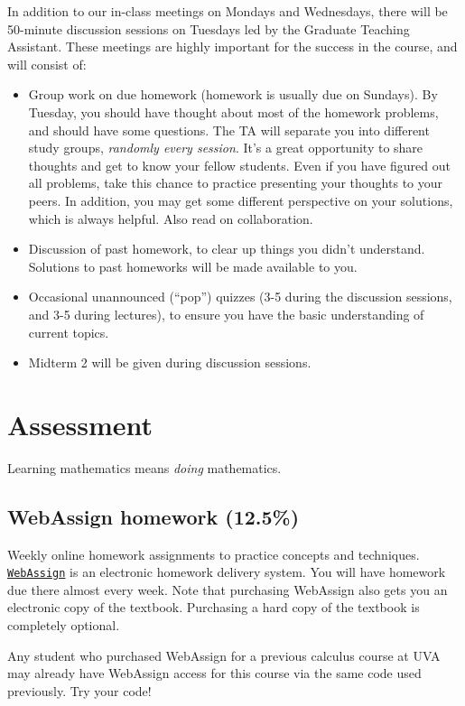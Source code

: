 \documentclass[oneside,11pt]{amsart}
\theoremstyle{definition}
\begin{document}
In addition to our in-class meetings on Mondays and Wednesdays, there will be 50-minute discussion sessions on Tuesdays led by the Graduate Teaching Assistant. These meetings are highly important for the success in the course, and will consist of:
\begin{itemize}
	\item 
		Group work on due homework (homework is usually due on Sundays). By Tuesday, you should have thought about most of the homework problems, and should have some questions. The TA will separate you into different study groups, \emph{randomly every session}. It's a great opportunity to share thoughts and get to know your fellow students. Even if you have figured out all problems, take this chance to practice presenting your thoughts to your peers. In addition, you may get some different perspective on your solutions, which is always helpful. Also read  on collaboration.
	\item 
	Discussion of past homework, to clear up things you didn't understand. Solutions to past homeworks will be made available to you.
	\item Occasional unannounced (``pop'') quizzes (3-5 during the discussion sessions, and 3-5 during lectures), to ensure you have the basic understanding of current topics.
	\item Midterm 2 will be given during discussion sessions.
\end{itemize}

\section{Assessment}

Learning mathematics means \emph{doing} mathematics. 

\subsection{WebAssign homework (12.5\%)} Weekly online homework assignments to practice concepts and techniques.
\href{https://www.webassign.net/}{\textcolor{green!70!black}{\texttt{WebAssign}}} is an electronic homework delivery system. You will have homework due there almost every week. Note that purchasing WebAssign also gets you an electronic copy of the textbook. Purchasing a hard copy of the textbook is completely optional.

Any student who purchased WebAssign for a previous calculus course at UVA may already have WebAssign access for this course via the same code used previously. Try your code!
\end{document}
